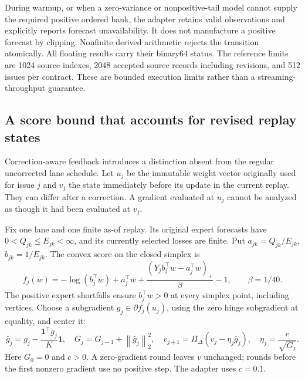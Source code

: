 \documentclass[11pt,a4paper]{article}
\theoremstyle{definition}\newtheorem{definition}[theorem]{Definition}
\newcommand{\norm}[1]{\left\lVert#1\right\rVert}
\begin{document}
During warmup, or when a zero-variance or nonpositive-tail model cannot supply the required positive ordered bank, the adapter retains valid observations and explicitly reports forecast unavailability. It does not manufacture a positive forecast by clipping. Nonfinite derived arithmetic rejects the transition atomically. All floating results carry their binary64 status. The reference limits are 1024 source indexes, 2048 accepted source records including revisions, and 512 issues per contract. These are bounded execution limits rather than a streaming-throughput guarantee.

\subsection{A score bound that accounts for revised replay states}
Correction-aware feedback introduces a distinction absent from the regular uncorrected lane schedule. Let $u_j$ be the immutable weight vector originally used for issue $j$ and $v_j$ the state immediately before its update in the current replay. They can differ after a correction. A gradient evaluated at $u_j$ cannot be analyzed as though it had been evaluated at $v_j$.

Fix one lane and one finite as-of replay. Its original expert forecasts have $0<Q_{jk}\leq E_{jk}<\infty$, and its currently selected losses are finite. Put $a_{jk}=Q_{jk}/E_{jk}$, $b_{jk}=1/E_{jk}$. The convex score on the closed simplex is
\begin{equation}
 f_j(w)=-\log(b_j^\top w)+a_j^\top w+
     \frac{(Y_jb_j^\top w-a_j^\top w)_+}{\beta}-1,
 \qquad \beta=1/40.
 \label{eq:streamscore}
\end{equation}
The positive expert shortfalls ensure $b_j^\top w>0$ at every simplex point, including vertices. Choose a subgradient $g_j\in\partial f_j(u_j)$, using the zero hinge subgradient at equality, and center it:
\begin{equation}
 \bar g_j=g_j-\frac{\boldsymbol{1}^\top g_j}{K}\boldsymbol{1},\quad
 G_j=G_{j-1}+\norm{\bar g_j}_2^2,\quad
 v_{j+1}=\Pi_\Delta(v_j-\eta_j\bar g_j),\quad
 \eta_j=\frac{c}{\sqrt{G_j}}.
 \label{eq:streamreplay}
\end{equation}
Here $G_0=0$ and $c>0$. A zero-gradient round leaves $v$ unchanged; rounds before the first nonzero gradient use no positive step. The adapter uses $c=0.1$.
\end{document}

